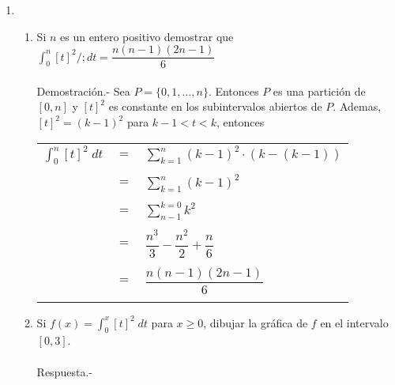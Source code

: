 \begin{enumerate}
\begin{enumerate}[\bfseries (a)]
    \end{enumerate}

    \item 
    \begin{enumerate}[\bfseries (a)]
	
	\item Si $n$ es un entero positivo demostrar que $\displaystyle\int_{0}^{n} [t]^2 /; dt = \dfrac{n(n-1)(2n-1)}{6}$\\\\
	    Demostración.-\; Sea $P=\lbrace 0,1,...,n \rbrace$. Entonces $P$ es una partición de $[0,n]$ y $[t]^2$ es constante en los subintervalos abiertos de $P$. Ademas, $[t]^2=(k-1)^2$ para $k-1<t<k$, entonces 
	    \begin{center}
		\begin{tabular}{rcl}
		    $\displaystyle\int_{0}^{n} [t]^2 \; dt$&$=$&$\sum\limits_{k=1}^{n}(k-1)^2 \cdot (k-(k-1))$\\\\
		    &$=$&$\sum\limits_{k=1}^{n} (k-1)^2$\\\\
		    &$=$&$\sum\limits_{n-1}^{k=0} k^2$\\\\
		    &$=$&$\dfrac{n^3}{3}-\dfrac{n^2}{2}+\dfrac{n}{6}$\\\\
		    &$=$&$\dfrac{n(n-1)(2n-1)}{6}$\\\\
		\end{tabular}
	    \end{center}

	\item Si $f(x)=\displaystyle\int_{0}^{x} [t]^2 \; dt$ para $x\geq 0$, dibujar la gráfica de $f$ en el intervalo $[0,3]$.\\\\
	    Respuesta.-\; 
	    \begin{center}
	    \end{center}
	    \vspace{.5cm}


\end{enumerate}
\end{enumerate}
